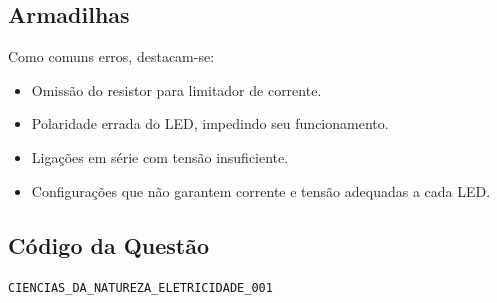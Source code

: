 \documentclass{article}
\begin{document}
\subsection*{Armadilhas}

Como comuns erros, destacam-se:

\begin{itemize}
  \item Omissão do resistor para limitador de corrente.
  \item Polaridade errada do LED, impedindo seu funcionamento.
  \item Ligações em série com tensão insuficiente.
  \item Configurações que não garantem corrente e tensão adequadas a cada LED.
\end{itemize}

\subsection*{Código da Questão}

\texttt{CIENCIAS\_DA\_NATUREZA\_ELETRICIDADE\_001}
\end{document}
